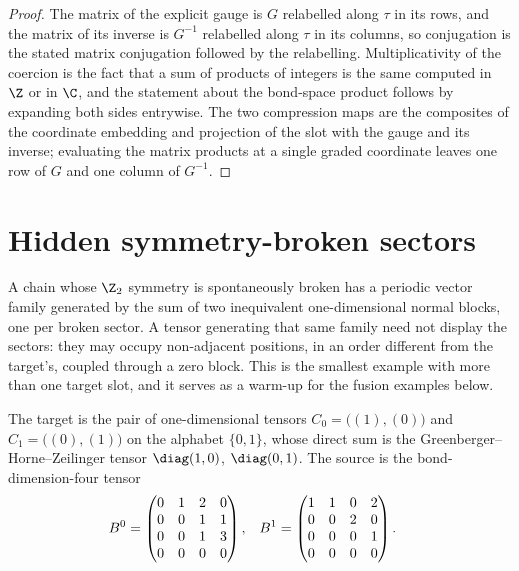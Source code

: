 \begin{proof}
    \leanok
    The matrix of the explicit gauge is $G$ relabelled along $\tau$ in its
    rows, and the matrix of its inverse is $G^{-1}$ relabelled along $\tau$
    in its columns, so conjugation is the stated matrix conjugation followed
    by the relabelling. Multiplicativity of the coercion is the fact that a
    sum of products of integers is the same computed in $\Z$ or in $\C$, and
    the statement about the bond-space product follows by expanding both
    sides entrywise. The two compression maps are the composites of the
    coordinate embedding and projection of the slot with the gauge and its
    inverse; evaluating the matrix products at a single graded coordinate
    leaves one row of $G$ and one column of $G^{-1}$.
\end{proof}

\section{Hidden symmetry-broken sectors}%
\label{sec:asymex_ghz}

A chain whose $\Z_2$ symmetry is spontaneously broken has a periodic vector
family generated by the sum of two inequivalent one-dimensional normal
blocks, one per broken sector. A tensor generating that same family need
not display the sectors: they may occupy non-adjacent positions, in an order
different from the target's, coupled through a zero block. This is the
smallest example with more than one target slot, and it serves as a warm-up
for the fusion examples below.

\begin{definition}
    \label{def:asymex_ghz}
    \leanok
    The target is the pair of one-dimensional tensors
    $C_0=\bigl((1),(0)\bigr)$ and $C_1=\bigl((0),(1)\bigr)$ on the alphabet
    $\{0,1\}$, whose direct sum is the Greenberger--Horne--Zeilinger tensor
    $\diag(1,0)$, $\diag(0,1)$. The source is the bond-dimension-four
    tensor
    \begin{align}
        B^0
         & =\begin{pmatrix}
                0 & 1 & 2 & 0 \\
                0 & 0 & 1 & 1 \\
                0 & 0 & 1 & 3 \\
                0 & 0 & 0 & 0
            \end{pmatrix},
         &
        B^1
         & =\begin{pmatrix}
                1 & 1 & 0 & 2 \\
                0 & 0 & 2 & 0 \\
                0 & 0 & 0 & 1 \\
                0 & 0 & 0 & 0
            \end{pmatrix}.
        \notag
    \end{align}
\end{definition}

